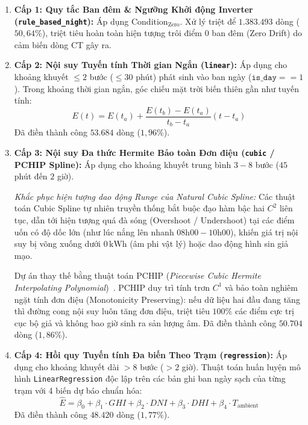 \documentclass[12pt, a4paper]{report}
\begin{document}
\begin{enumerate}[label=\alph*., leftmargin=*]
    \item \textbf{Cấp 1: Quy tắc Ban đêm \& Ngưỡng Khởi động Inverter (\texttt{rule\_based\_night}):}
    Áp dụng $\text{Condition}_{\text{Zero}}$. Xử lý triệt để $1.383.493$ dòng ($50{,}64\%$), triệt tiêu hoàn toàn hiện tượng trôi điểm 0 ban đêm (Zero Drift) do cảm biến dòng CT gây ra.

    \item \textbf{Cấp 2: Nội suy Tuyến tính Thời gian Ngắn (\texttt{linear}):}
    Áp dụng cho khoảng khuyết $\le 2$ bước ($\le 30$ phút) phát sinh vào ban ngày ($\texttt{is\_day} == 1$). Trong khoảng thời gian ngắn, góc chiếu mặt trời biến thiên gần như tuyến tính:
    \begin{equation}
    E(t) = E(t_a) + \frac{E(t_b) - E(t_a)}{t_b - t_a} (t - t_a)
    \end{equation}
    Đã điền thành công $53.684$ dòng ($1{,}96\%$).

    \item \textbf{Cấp 3: Nội suy Đa thức Hermite Bảo toàn Đơn điệu (\texttt{cubic} / PCHIP Spline):}
    Áp dụng cho khoảng khuyết trung bình $3 - 8$ bước ($45$ phút đến $2$ giờ). 
    
    \textit{Khắc phục hiện tượng dao động Runge của Natural Cubic Spline:} Các thuật toán Cubic Spline tự nhiên truyền thống bắt buộc đạo hàm bậc hai $C^2$ liên tục, dẫn tới hiện tượng quá đà sóng (Overshoot / Undershoot) tại các điểm uốn có độ dốc lớn (như lúc nắng lên nhanh $08\text{h}00-10\text{h}00$), khiến giá trị nội suy bị võng xuống dưới $0\,\text{kWh}$ (âm phi vật lý) hoặc dao động hình sin giả mạo. 
    
    Dự án thay thế bằng thuật toán PCHIP (\textit{Piecewise Cubic Hermite Interpolating Polynomial})~\cite{fritsch1980pchip}. PCHIP duy trì tính trơn $C^1$ và bảo toàn nghiêm ngặt tính đơn điệu (Monotonicity Preserving): nếu dữ liệu hai đầu đang tăng thì đường cong nội suy luôn tăng đơn điệu, triệt tiêu $100\%$ các điểm cực trị cục bộ giả và không bao giờ sinh ra sản lượng âm. Đã điền thành công $50.704$ dòng ($1{,}86\%$).

    \item \textbf{Cấp 4: Hồi quy Tuyến tính Đa biến Theo Trạm (\texttt{regression}):}
    Áp dụng cho khoảng khuyết dài $> 8$ bước ($> 2$ giờ). Thuật toán huấn luyện mô hình \texttt{LinearRegression} độc lập trên các bản ghi ban ngày sạch của từng trạm với 4 biến dự báo chuẩn hóa:
    \begin{equation}
    \hat{E} = \beta_0 + \beta_1 \cdot GHI + \beta_2 \cdot DNI + \beta_3 \cdot DHI + \beta_4 \cdot T_{\text{ambient}}
    \end{equation}
    Đã điền thành công $48.420$ dòng ($1{,}77\%$).
\end{enumerate}
\end{document}
